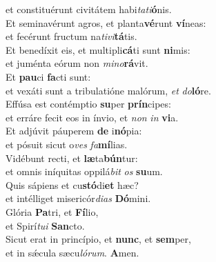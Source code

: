 \evenverse et constituérunt civitátem habi\textit{ta}\textit{ti}\textbf{ó}nis.\\
\oddverse Et seminavérunt agros, et planta\textbf{vé}runt \textbf{ví}neas:~\*\\
\oddverse et fecérunt fructum na\textit{ti}\textit{vi}\textbf{tá}tis.\\
\evenverse Et benedíxit eis, et multipli\textbf{cá}ti sunt \textbf{ni}mis:~\*\\
\evenverse et juménta eórum non \textit{mi}\textit{no}\textbf{rá}vit.\\
\oddverse Et \textbf{pau}ci \textbf{fa}cti sunt:~\*\\
\oddverse et vexáti sunt a tribulatióne malórum, \textit{et} \textit{do}\textbf{ló}re.\\
\evenverse Effúsa est contémptio \textbf{su}per \textbf{prín}cipes:~\*\\
\evenverse et erráre fecit eos in ínvio, et \textit{non} \textit{in} \textbf{vi}a.\\
\oddverse Et adjúvit páuperem \textbf{de} i\textbf{nó}pia:~\*\\
\oddverse et pósuit sicut o\textit{ves} \textit{fa}\textbf{mí}lias.\\
\evenverse Vidébunt recti, et \textbf{læ}ta\textbf{bún}tur:~\*\\
\evenverse et omnis iníquitas oppilá\textit{bit} \textit{os} \textbf{su}um.\\
\oddverse Quis sápiens et cu\textbf{stó}di\textbf{et} hæc?~\*\\
\oddverse et intélliget misericór\textit{di}\textit{as} \textbf{Dó}mini.\\
\evenverse Glória \textbf{Pa}tri, et \textbf{Fí}lio,~\*\\
\evenverse et Spirí\textit{tu}\textit{i} \textbf{San}cto.\\
\oddverse Sicut erat in princípio, et \textbf{nunc}, et \textbf{sem}per,~\*\\
\oddverse et in sǽcula sæcu\textit{ló}\textit{rum}. \textbf{A}men.\\
